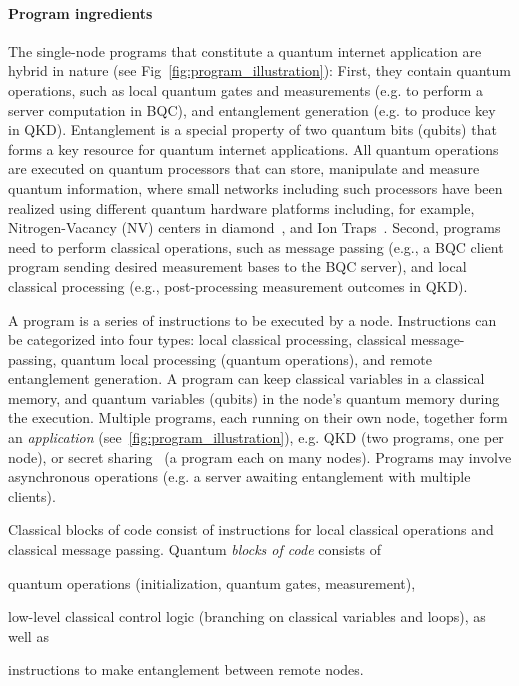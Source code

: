 \paragraph{Program ingredients}

The single-node programs that constitute a quantum internet application are hybrid in nature (see Fig~\ref{fig:program_illustration}):
First, they contain quantum operations, such as local quantum gates and measurements (e.g. to perform a server computation in BQC), and entanglement generation (e.g. to produce key in QKD). Entanglement is a special property of two quantum bits (qubits) that forms a key resource for quantum internet applications. 
All quantum operations are executed on quantum processors that can store, manipulate and measure quantum information, where small networks including such processors have been realized using different quantum hardware platforms including, for example,  Nitrogen-Vacancy (NV) centers in diamond~\cite{pompili2021realization}, and Ion Traps~\cite{krutyanskiy2023entanglement}.
Second, programs need to perform classical operations, such as message passing (e.g., a BQC client program sending desired measurement bases to the BQC server), and local classical processing (e.g., post-processing measurement outcomes in QKD).


A program is a series of instructions to be executed by a node.
Instructions can be categorized into four types: local classical processing, classical message-passing, quantum local processing (quantum operations), and remote entanglement generation.
A program can keep classical variables in a classical memory, and quantum variables (qubits) in the node's quantum memory during the execution.
Multiple programs, each running on their own node, together form an \textit{application} (see~\ref{fig:program_illustration}), e.g. QKD (two programs, one per node),
or secret sharing~\cite{hillery1999quantum} (a program each on many nodes).
Programs may involve asynchronous operations (e.g. a server awaiting entanglement with multiple clients).


Classical blocks of code consist of instructions for local classical operations and classical message passing. Quantum \emph{blocks of code} consists of
%
\begin{inlinelist}
\item quantum operations (initialization, quantum gates, measurement), 
\item low-level classical control logic (branching on classical variables and loops), as well as 
\item instructions to make entanglement between remote nodes. 
\end{inlinelist}
%

